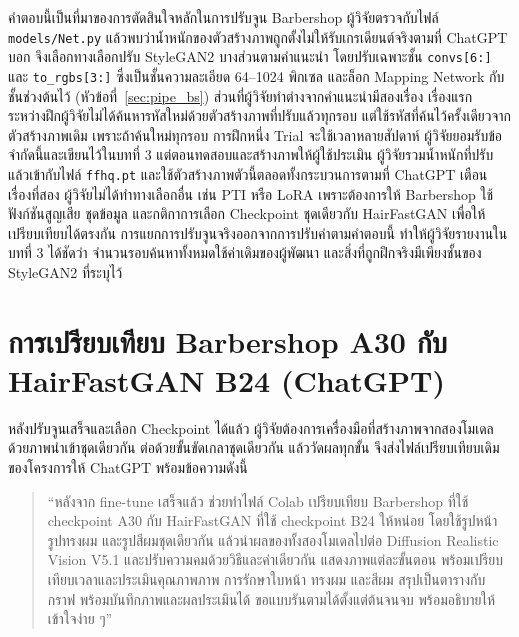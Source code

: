 คำตอบนี้เป็นที่มาของการตัดสินใจหลักในการปรับจูน Barbershop
ผู้วิจัยตรวจกับไฟล์ \texttt{models/Net.py} แล้วพบว่าน้ำหนักของตัวสร้างภาพถูกตั้งไม่ให้รับเกรเดียนต์จริงตามที่ ChatGPT บอก
จึงเลือกทางเลือกปรับ StyleGAN2 บางส่วนตามคำแนะนำ โดยปรับเฉพาะชั้น \texttt{convs[6:]} และ \texttt{to\_rgbs[3:]}
ซึ่งเป็นชั้นความละเอียด 64--1024 พิกเซล และล็อก Mapping Network กับชั้นช่วงต้นไว้ (หัวข้อที่~\ref{sec:pipe_bs})
ส่วนที่ผู้วิจัยทำต่างจากคำแนะนำมีสองเรื่อง
เรื่องแรก ระหว่างฝึกผู้วิจัยไม่ได้ค้นหารหัสใหม่ด้วยตัวสร้างภาพที่ปรับแล้วทุกรอบ แต่ใช้รหัสที่ค้นไว้ครั้งเดียวจากตัวสร้างภาพเดิม
เพราะถ้าค้นใหม่ทุกรอบ การฝึกหนึ่ง Trial จะใช้เวลาหลายสัปดาห์ ผู้วิจัยยอมรับข้อจำกัดนี้และเขียนไว้ในบทที่ 3
แต่ตอนทดสอบและสร้างภาพให้ผู้ใช้ประเมิน ผู้วิจัยรวมน้ำหนักที่ปรับแล้วเข้ากับไฟล์ \texttt{ffhq.pt}
และใช้ตัวสร้างภาพตัวนี้ตลอดทั้งกระบวนการตามที่ ChatGPT เตือน
เรื่องที่สอง ผู้วิจัยไม่ได้ทำทางเลือกอื่น เช่น PTI หรือ LoRA เพราะต้องการให้ Barbershop ใช้ฟังก์ชันสูญเสีย
ชุดข้อมูล และกติกาการเลือก Checkpoint ชุดเดียวกับ HairFastGAN เพื่อให้เปรียบเทียบได้ตรงกัน
การแยกการปรับจูนจริงออกจากการปรับค่าตามคำตอบนี้ ทำให้ผู้วิจัยรายงานในบทที่ 3 ได้ชัดว่า
จำนวนรอบค้นหาทั้งหมดใช้ค่าเดิมของผู้พัฒนา และสิ่งที่ถูกฝึกจริงมีเพียงชั้นของ StyleGAN2 ที่ระบุไว้

\section{การเปรียบเทียบ Barbershop A30 กับ HairFastGAN B24 \mbox{(ChatGPT)}}
\label{sec:ai_compare}

หลังปรับจูนเสร็จและเลือก Checkpoint ได้แล้ว ผู้วิจัยต้องการเครื่องมือที่สร้างภาพจากสองโมเดลด้วยภาพนำเข้าชุดเดียวกัน
ต่อด้วยขั้นขัดเกลาชุดเดียวกัน แล้ววัดผลทุกขั้น จึงส่งไฟล์เปรียบเทียบเดิมของโครงการให้ ChatGPT พร้อมข้อความดังนี้
\begin{quote}
\small ``หลังจาก fine-tune เสร็จแล้ว ช่วยทำไฟล์ Colab เปรียบเทียบ Barbershop ที่ใช้ checkpoint A30
กับ HairFastGAN ที่ใช้ checkpoint B24 ให้หน่อย โดยใช้รูปหน้า รูปทรงผม และรูปสีผมชุดเดียวกัน
แล้วนำผลของทั้งสองโมเดลไปต่อ Diffusion Realistic Vision V5.1 และปรับความคมด้วยวิธีและค่าเดียวกัน
แสดงภาพแต่ละขั้นตอน พร้อมเปรียบเทียบเวลาและประเมินคุณภาพภาพ การรักษาใบหน้า ทรงผม และสีผม
สรุปเป็นตารางกับกราฟ พร้อมบันทึกภาพและผลประเมินได้ ขอแบบรันตามได้ตั้งแต่ต้นจนจบ พร้อมอธิบายให้เข้าใจง่าย ๆ''
\end{quote}

